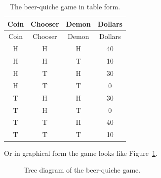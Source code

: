 \documentclass[
  12pt,
  letterpaper,
  DIV=11,
  numbers=noendperiod]{scrreprt}
\begin{document}
\begin{longtable}[]{@{}cccc@{}}
\caption{The beer-quiche game in table
form.}\label{tbl-cho-kreps}\tabularnewline
\toprule\noalign{}
Coin & Chooser & Demon & Dollars \\
\midrule\noalign{}
\endfirsthead
\toprule\noalign{}
Coin & Chooser & Demon & Dollars \\
\midrule\noalign{}
\endhead
\bottomrule\noalign{}
\endlastfoot
H & H & H & 40 \\
H & H & T & 10 \\
H & T & H & 30 \\
H & T & T & 0 \\
T & H & H & 30 \\
T & H & T & 0 \\
T & T & H & 40 \\
T & T & T & 10 \\
\end{longtable}

Or in graphical form the game looks like Figure~\ref{fig-cho-kreps}.

\begin{figure}


\caption{\label{fig-cho-kreps}Tree diagram of the beer-quiche game.}

\end{figure}%
\end{document}
